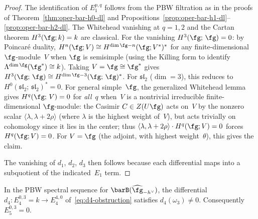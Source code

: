 \begin{proof}
The identification of $E_1^{p,q}$ follows from the PBW filtration
as in the proofs of Theorem~\ref{thm:oper-bar-h0-dl} and
Propositions~\ref{prop:oper-bar-h1-dl}--\ref{prop:oper-bar-h2-dl}.
The Whitehead vanishing at $q = 1, 2$ and the Cartan theorem
$H^3(\fg; k) = k$ are classical. For the vanishing
$H^3(\fg;\, \fg) = 0$: by Poincar\'e duality,
$H^n(\fg; V) \cong H^{\dim\fg - n}(\fg; V^*)^*$ for any
finite-dimensional $\fg$-module~$V$ when $\fg$ is semisimple
(using the Killing form to identify
$\Lambda^{\dim\fg}(\fg^*) \cong k$). Taking $V = \fg \cong \fg^*$
gives $H^3(\fg;\, \fg) \cong H^{\dim\fg - 3}(\fg;\, \fg)^*$.
For $\mathfrak{sl}_2$ ($\dim = 3$), this reduces to $H^0(\mathfrak{sl}_2;\, \mathfrak{sl}_2)^* = 0$.
For general simple~$\fg$, the generalized Whitehead lemma gives
$H^q(\fg;\, V) = 0$ for \emph{all}~$q$ when~$V$ is a
nontrivial irreducible finite-dimensional $\fg$-module:
the Casimir $C \in Z(U\fg)$ acts on~$V$ by the nonzero scalar
$\langle \lambda, \lambda + 2\rho\rangle$ (where $\lambda$ is the
highest weight of~$V$), but acts trivially on cohomology
since it lies in the center; thus
$\langle \lambda, \lambda + 2\rho\rangle \cdot H^q(\fg; V)
= 0$ forces $H^q(\fg; V) = 0$. For $V = \fg$ (the adjoint,
with highest weight~$\theta$), this gives the claim.

The vanishing of $d_1$, $d_2$, $d_3$ then follows because each
differential maps into a subquotient of the indicated~$E_1$ term.
\end{proof}

\begin{proposition}
\label{prop:d4-nonvanishing}
In the PBW spectral sequence for $\barB(\widehat{\fg}_{-h^\vee})$,
the differential
$d_4\colon E_4^{0,3} = k \to E_4^{4,0}$
of~\eqref{eq:d4-obstruction} satisfies $d_4(\omega_3) \neq 0$.
Consequently $E_5^{0,3} = 0$.
\end{proposition}

